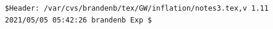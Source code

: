\documentclass[twocolumn]{article}
\begin{document}



\vfill\bigskip\noindent\tiny\begin{verbatim}
$Header: /var/cvs/brandenb/tex/GW/inflation/notes3.tex,v 1.11 2021/05/05 05:42:26 brandenb Exp $
\end{verbatim}
\end{document}
